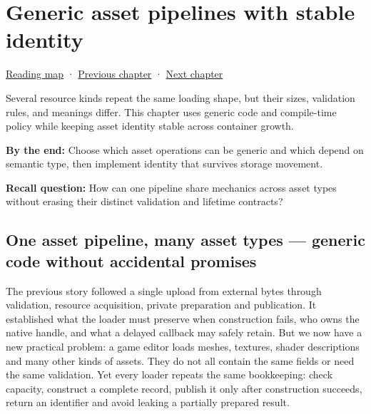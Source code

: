 \chapter{Generic asset pipelines with stable identity}\label{05-engine-i-ch005-generic-asset-pipelines-with-stable-identity}\hypertarget{05-engine-i-ch005}{}\label{stagechapter:05-engine-i-ch005}

\hypertarget{05-engine-i-ch005-generic-asset-pipelines-with-stable-identity}{}

\hyperref[volume-reading-map]{Reading map} · \hyperref[05-engine-i-ch004-resource-ownership-failure-paths-and-review-practice]{Previous chapter} · \hyperref[05-engine-i-ch006-queries-lazy-ranges-allocators-and-module-boundaries]{Next chapter}

Several resource kinds repeat the same loading shape, but their sizes, validation rules, and meanings differ. This chapter uses generic code and compile-time policy while keeping asset identity stable across container growth.

\textbf{By the end:} Choose which asset operations can be generic and which depend on semantic type, then implement identity that survives storage movement.

\textbf{Recall question:} How can one pipeline share mechanics across asset types without erasing their distinct validation and lifetime contracts?

\section{One asset pipeline, many asset types --- generic code without accidental promises}\label{05-engine-i-ch005-one-asset-pipeline-many-asset-types-generic-code-without-accidental-promises}

\hypertarget{05-engine-i-ch005-one-asset-pipeline-many-asset-types-generic-code-without-accidental-promises}{}

The previous story followed a single upload from external bytes through validation, resource acquisition, private preparation and publication. It established what the loader must preserve when construction fails, who owns the native handle, and what a delayed callback may safely retain. But we now have a new practical problem: a game editor loads meshes, textures, shader descriptions and many other kinds of assets. They do not all contain the same fields or need the same validation. Yet every loader repeats the same bookkeeping: check capacity, construct a complete record, publish it only after construction succeeds, return an identifier and avoid leaking a partially prepared result.

